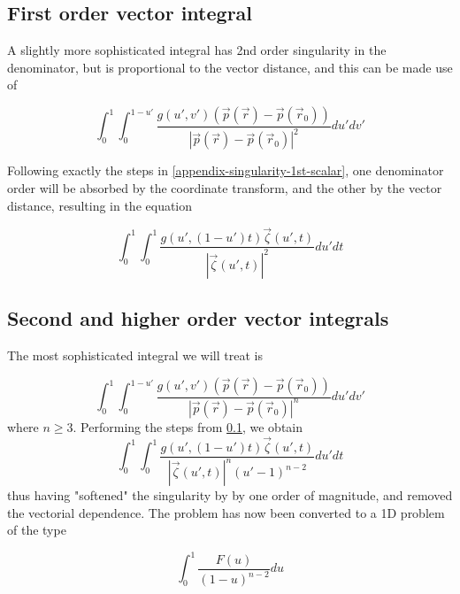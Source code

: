 \subsection{First order vector integral}
\label{appendix-singularity-1st-vector}

A slightly more sophisticated integral has 2nd order singularity in the denominator, but is proportional to the vector distance, and this can be made use of

\[ \int_0^1 \int_0^{1-u'} \frac{g(u',v') (\vec{p}(\vec{r}) - \vec{p}(\vec{r}_0))}{|\vec{p}(\vec{r}) - \vec{p}(\vec{r}_0)|^2} du' dv' \]

\noindent
Following exactly the steps in \cref{appendix-singularity-1st-scalar}, one denominator order will be absorbed by the coordinate transform, and the other by the vector distance, resulting in the equation

\[ \int_0^1 \int_0^1 \frac{g(u',(1-u')t) \vec{\zeta}(u', t)}{|\vec{\zeta}(u', t)|^2} du' dt \]





\subsection{Second and higher order vector integrals}

The most sophisticated integral we will treat is 

\[ \int_0^1 \int_0^{1-u'} \frac{g(u',v') (\vec{p}(\vec{r}) - \vec{p}(\vec{r}_0))}{|\vec{p}(\vec{r}) - \vec{p}(\vec{r}_0)|^n} du' dv' \]
\noindent
where $n \geq 3$. Performing the steps from \cref{appendix-singularity-1st-vector}, we obtain 
\[ \int_0^1 \int_0^1 \frac{g(u',(1-u')t) \vec{\zeta}(u', t)}{|\vec{\zeta}(u', t)|^n (u' - 1)^{n-2}} du' dt \]
\noindent
thus having "softened" the singularity by by one order of magnitude, and removed the vectorial dependence. The problem has now been converted to a 1D problem of the type

\[ \int_0^1 \frac{F(u)}{(1-u)^{n-2}}du  \]





